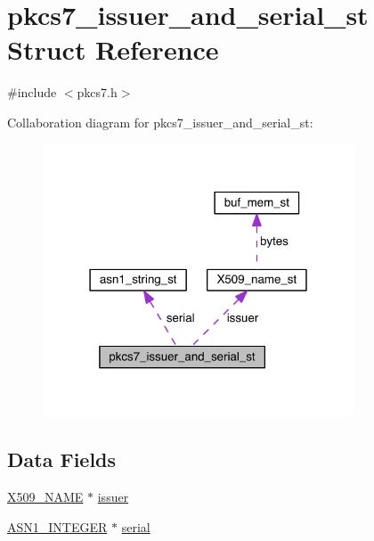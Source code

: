 \hypertarget{structpkcs7__issuer__and__serial__st}{}\section{pkcs7\+\_\+issuer\+\_\+and\+\_\+serial\+\_\+st Struct Reference}
\label{structpkcs7__issuer__and__serial__st}


{\ttfamily \#include $<$pkcs7.\+h$>$}



Collaboration diagram for pkcs7\+\_\+issuer\+\_\+and\+\_\+serial\+\_\+st\+:\nopagebreak
\begin{figure}[H]
\begin{center}
\leavevmode
\includegraphics[width=262pt]{structpkcs7__issuer__and__serial__st__coll__graph}
\end{center}
\end{figure}
\subsection*{Data Fields}
\begin{DoxyCompactItemize}
\item 
\hyperlink{crypto_2ossl__typ_8h_a5c5fc036757e87b9bd163d0221696533}{X509\+\_\+\+N\+A\+ME} $\ast$ \hyperlink{structpkcs7__issuer__and__serial__st_a45017edc554e7984544678696c7a2e75}{issuer}
\item 
\hyperlink{crypto_2ossl__typ_8h_af4335399bf9774cb410a5e93de65998b}{A\+S\+N1\+\_\+\+I\+N\+T\+E\+G\+ER} $\ast$ \hyperlink{structpkcs7__issuer__and__serial__st_ae89753d950d21e4c15c296fced78c1b6}{serial}
\end{DoxyCompactItemize}



